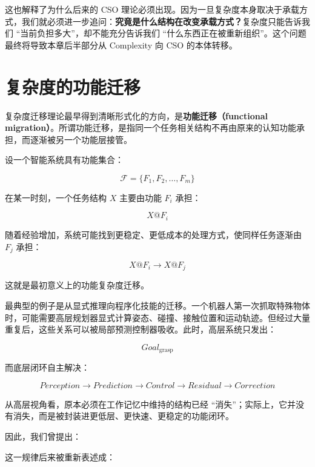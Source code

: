 这也解释了为什么后来的 CSO 理论必须出现。因为一旦复杂度本身取决于承载方式，我们就必须进一步追问：\textbf{究竟是什么结构在改变承载方式？}复杂度只能告诉我们 ``当前负担多大''，却不能充分告诉我们 ``什么东西正在被重新组织''。这个问题最终将导致本章后半部分从 Complexity 向 CSO 的本体转移。

\section{复杂度的功能迁移}
\label{sec:functional-complexity-migration}

复杂度迁移理论最早得到清晰形式化的方向，是\textbf{功能迁移（functional migration）}。所谓功能迁移，是指同一个任务相关结构不再由原来的认知功能承担，而逐渐被另一个功能层接管。

设一个智能系统具有功能集合：

\[
\mathcal{F}
=
\{F_1,F_2,\ldots,F_m\}
\]

在某一时刻，一个任务结构 $X$ 主要由功能 $F_i$ 承担：

\[
X@F_i
\]

随着经验增加，系统可能找到更稳定、更低成本的处理方式，使同样任务逐渐由 $F_j$ 承担：

\[
\boxed{
X@F_i
\rightarrow
X@F_j
}
\]

这就是最初意义上的功能复杂度迁移。

最典型的例子是从显式推理向程序化技能的迁移。一个机器人第一次抓取特殊物体时，可能需要高层规划器显式计算姿态、碰撞、接触位置和运动轨迹。但经过大量重复后，这些关系可以被局部预测控制器吸收。此时，高层系统只发出：

\[
Goal_{\mathrm{grasp}}
\]

而底层闭环自主解决：

\[
Perception
\rightarrow
Prediction
\rightarrow
Control
\rightarrow
Residual
\rightarrow
Correction
\]

从高层视角看，原本必须在工作记忆中维持的结构已经 ``消失''；实际上，它并没有消失，而是被封装进更低层、更快速、更稳定的功能闭环。

因此，我们曾提出：

\begin{statementbox}
\centering
{}
\end{statementbox}

这一规律后来被重新表述成：

\begin{statementbox}
\centering
{}
\end{statementbox}

